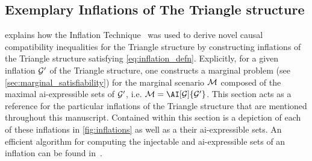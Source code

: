 \documentclass[aps, 10pt, english, twoside, pra, nofootinbib, tightenlines, longbibliography, superscriptaddress]{revtex4-1}
\begin{document}


    \subsection{Exemplary Inflations of The Triangle structure}
    \label{sec:exemplary_inflations_of_the_triangle structure}

     explains how the Inflation Technique~\cite{Inflation} was used to derive novel causal compatibility inequalities for the Triangle structure by constructing inflations of the Triangle structure satisfying \cref{eq:inflation_defn}. Explicitly, for a given inflation $\mathcal{G}'$ of the Triangle structure, one constructs a marginal problem (see \cref{sec:marginal_satisfiability}) for the marginal scenario $\mathcal{M}$ composed of the maximal ai-expressible sets of $\mathcal{G}'$, i.e. $\mscenario = \AI[\graph]{\graph'}$. This section acts as a reference for the particular inflations of the Triangle structure that are mentioned throughout this manuscript. Contained within this section is a depiction of each of these inflations in \cref{fig:inflations} as well as a their ai-expressible sets. An efficient algorithm for computing the injectable and ai-expressible sets of an inflation can be found in~\cite{Inflation}.
\end{document}
